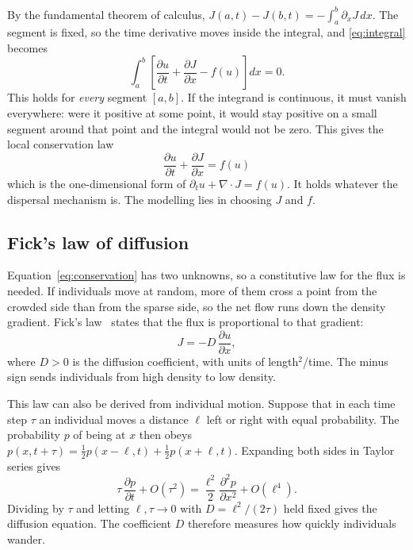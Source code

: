 \documentclass[11pt,a4paper]{article}
\newcommand{\pd}[2]{\frac{\partial #1}{\partial #2}}
\newcommand{\pdd}[2]{\frac{\partial^2 #1}{\partial #2^2}}
\begin{document}
By the fundamental theorem of calculus, $J(a,t)-J(b,t)=-\int_a^b \partial_x J\,dx$. The segment is fixed, so
the time derivative moves inside the integral, and \eqref{eq:integral} becomes
\begin{equation}
  \int_a^b\left[\pd{u}{t}+\pd{J}{x}-f(u)\right]dx=0 .
\end{equation}
This holds for \emph{every} segment $[a,b]$. If the integrand is continuous, it must vanish
everywhere: were it positive at some point, it would stay positive on a small segment around that
point and the integral would not be zero. This gives the local conservation law
\begin{equation}
  \boxed{\;\pd{u}{t}+\pd{J}{x}=f(u)\;}
  \label{eq:conservation}
\end{equation}
which is the one-dimensional form of $\partial_t u+\nabla\!\cdot\!J=f(u)$. It holds whatever the
dispersal mechanism is. The modelling lies in choosing $J$ and $f$.

\subsection{Fick's law of diffusion}
Equation~\eqref{eq:conservation} has two unknowns, so a constitutive law for the flux is needed. If
individuals move at random, more of them cross a point from the crowded side than from the sparse
side, so the net flow runs down the density gradient. Fick's law~\cite{fick} states that the
flux is proportional to that gradient:
\begin{equation}
  J=-D\,\pd{u}{x},
  \label{eq:fick}
\end{equation}
where $D>0$ is the diffusion coefficient, with units of length$^2$/time. The minus sign sends
individuals from high density to low density.

This law can also be derived from individual motion. Suppose that in each time step $\tau$ an
individual moves a distance $\ell$ left or right with equal probability. The probability $p$ of being
at $x$ then obeys $p(x,t+\tau)=\tfrac12 p(x-\ell,t)+\tfrac12 p(x+\ell,t)$. Expanding both sides in
Taylor series gives
\begin{equation}
  \tau\,\pd{p}{t}+O(\tau^2)=\frac{\ell^2}{2}\pdd{p}{x}+O(\ell^4).
\end{equation}
Dividing by $\tau$ and letting $\ell,\tau\to0$ with $D=\ell^2/(2\tau)$ held fixed gives the diffusion
equation. The coefficient $D$ therefore measures how quickly individuals wander.
\end{document}
